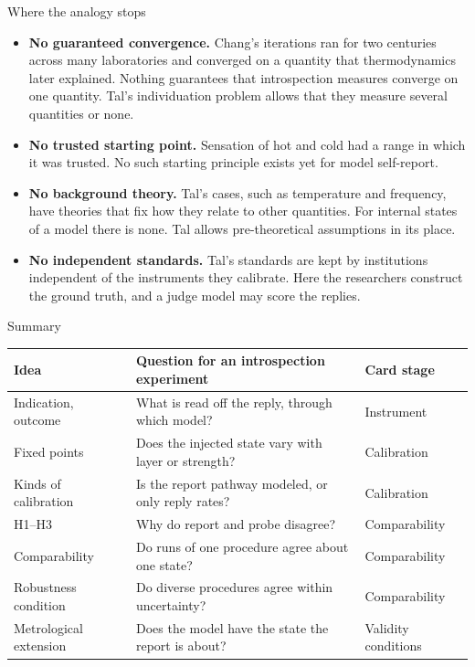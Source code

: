 \documentclass[aspectratio=169,11pt]{beamer}
\begin{document}
\begin{frame}[label=limits]{Where the analogy stops}
\begin{itemize}\setlength\itemsep{1pt}
  \item {\small \textbf{No guaranteed convergence.} Chang's iterations ran for two centuries across many laboratories and converged on a quantity that thermodynamics later explained. Nothing guarantees that introspection measures converge on one quantity. Tal's individuation problem allows that they measure several quantities or none.}
  \item {\small \textbf{No trusted starting point.} Sensation of hot and cold had a range in which it was trusted. No such starting principle exists yet for model self-report.}
  \item {\small \textbf{No background theory.} Tal's cases, such as temperature and frequency, have theories that fix how they relate to other quantities. For internal states of a model there is none. Tal allows pre-theoretical assumptions in its place.}
  \item {\small \textbf{No independent standards.} Tal's standards are kept by institutions independent of the instruments they calibrate. Here the researchers construct the ground truth, and a judge model may score the replies.}
\end{itemize}
\end{frame}

\begin{frame}[label=summary]{Summary}
\begin{center}
{\footnotesize\renewcommand{\arraystretch}{1.05}\setlength{\tabcolsep}{4pt}
\begin{tabular}{>{\raggedright\arraybackslash}p{3.1cm}>{\raggedright\arraybackslash}p{7.4cm}>{\raggedright\arraybackslash}p{2.4cm}}
\toprule
\textbf{Idea} & \textbf{Question for an introspection experiment} & \textbf{Card stage} \\
\midrule
Indication, outcome & What is read off the reply, through which model? & Instrument \\
Fixed points & Does the injected state vary with layer or strength? & Calibration \\
Kinds of calibration & Is the report pathway modeled, or only reply rates? & Calibration \\
H1--H3 & Why do report and probe disagree? & Comparability \\
Comparability & Do runs of one procedure agree about one state? & Comparability \\
Robustness condition & Do diverse procedures agree within uncertainty? & Comparability \\
Metrological extension & Does the model have the state the report is about? & Validity conditions \\
\bottomrule
\end{tabular}
}
\end{center}
\end{frame}
\end{document}
